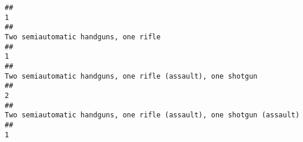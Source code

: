 \documentclass[
]{article}
\begin{document}
\begin{verbatim}
##                                                                                                                                                                                                                                                                                                                                                                                                     1 
##                                                                                                                                                                                                                                                                                                                                                                 Two semiautomatic handguns, one rifle 
##                                                                                                                                                                                                                                                                                                                                                                                                     1 
##                                                                                                                                                                                                                                                                                                                                          Two semiautomatic handguns, one rifle (assault), one shotgun 
##                                                                                                                                                                                                                                                                                                                                                                                                     2 
##                                                                                                                                                                                                                                                                                                                                Two semiautomatic handguns, one rifle (assault), one shotgun (assault) 
##                                                                                                                                                                                                                                                                                                                                                                                                     1 

\end{verbatim}
\end{document}
